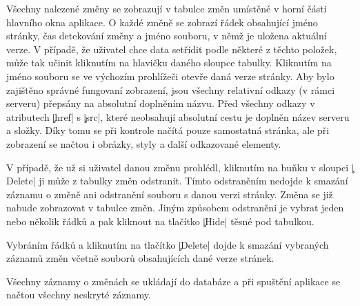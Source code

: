 Všechny nalezené změny se zobrazují v tabulce změn umístěné v horní části hlavního okna aplikace.
O každé změně se zobrazí řádek obsahující jméno stránky, čas detekování změny a jméno souboru, v němž je uložena aktuální verze.
V případě, že uživatel chce data setřídit podle některé z těchto položek, může tak učinit kliknutím na hlavičku daného sloupce tabulky.
Kliknutím na jméno souboru se ve výchozím prohlížeči otevře daná verze stránky.
Aby bylo zajištěno správné fungovaní zobrazení, jsou všechny relativní odkazy (v rámci serveru) přepsány na absolutní doplněním názvu.
Před všechny odkazy v atributech \c|href| s \c|src|, které neobsahují absolutní cestu je doplněn název serveru a složky.
Díky tomu se při kontrole načítá pouze samostatná stránka, ale při zobrazení se načtou i obrázky, styly a další odkazované elementy.

V případě, že už si uživatel danou změnu prohlédl, kliknutím na buňku v sloupci \c|Delete| ji může z tabulky změn odstranit.
Tímto odstraněním nedojde k smazání záznamu o změně ani odstranění souboru s danou verzi stránky.
Změna se již nabude zobrazovat v tabulce změn.
Jiným způsobem odstraněni je vybrat jeden nebo několik řádků a pak kliknout na tlačítko \c|Hide| těsné pod tabulkou.

Vybráním řádků a kliknutím na tlačítko \c|Delete| dojde k smazání vybraných záznamů změn včetně souborů obsahujících dané verze stránek.

Všechny záznamy o změnách se ukládají do databáze a při spuštění aplikace se načtou všechny neskryté záznamy. 
